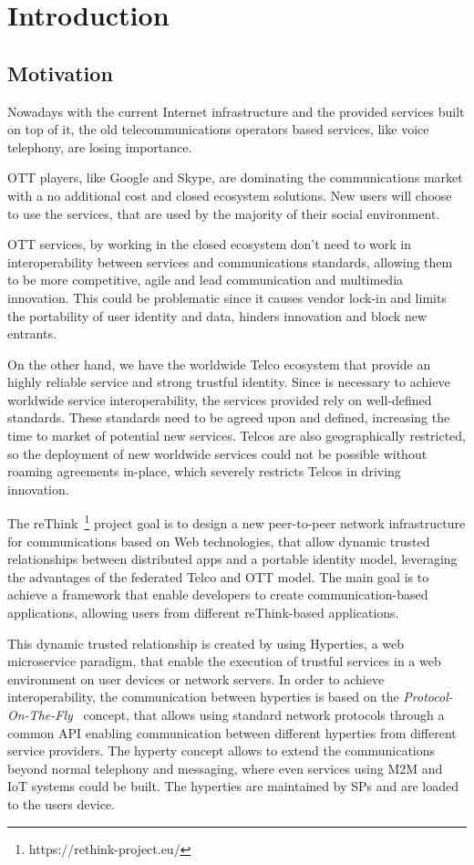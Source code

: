 \chapter{Introduction}
\label{chapter:introduction}

\section{Motivation}
\label{section:motivation}

Nowadays with the current Internet infrastructure and the provided services built on top of it, the old telecommunications operators based services, like voice telephony, are losing importance.

\ac{OTT} players, like Google and Skype, are dominating the communications market with a no additional cost and closed ecosystem solutions.
New users will choose to use the services, that are used by the majority of their social environment.

\ac{OTT} services, by working in the closed ecosystem don't need to work in interoperability between services and communications standards, allowing them to be more competitive, agile and lead communication and multimedia innovation.
This could be problematic since it causes vendor lock-in and limits the portability of user identity and data, hinders innovation and block new entrants.

On the other hand, we have the worldwide Telco ecosystem that provide an highly reliable service and strong trustful identity.
Since is necessary to achieve worldwide service interoperability, the services provided rely on well-defined standards. These standards need to be agreed upon and defined, increasing the time to market of potential new services.
Telcos are also geographically restricted, so the deployment of new worldwide services could not be possible without roaming agreements in-place, which severely restricts Telcos in driving innovation.

The reThink~\footnote{https://rethink-project.eu/} project goal is to design a new peer-to-peer network infrastructure for communications based on Web technologies, that allow dynamic trusted relationships between distributed apps and a portable identity model, leveraging the advantages of the federated Telco and \ac{OTT} model.
The main goal is to achieve a framework that enable developers to create communication-based applications, allowing users from different reThink-based applications.

This dynamic trusted relationship is created by using \ac{Hyperties}, a web microservice paradigm, that enable the execution of trustful services in a web environment on user devices or network servers.
In order to achieve interoperability, the communication between hyperties is based on the \textit{Protocol-On-The-Fly}~\cite{protofly} concept, that allows using standard network protocols through a common API enabling communication between different hyperties from different service providers.
The hyperty concept allows to extend the communications beyond normal telephony and messaging, where even services using \ac{M2M} and \ac{IoT} systems could be built.
The hyperties are maintained by \acp{SP} and are loaded to the users device.


